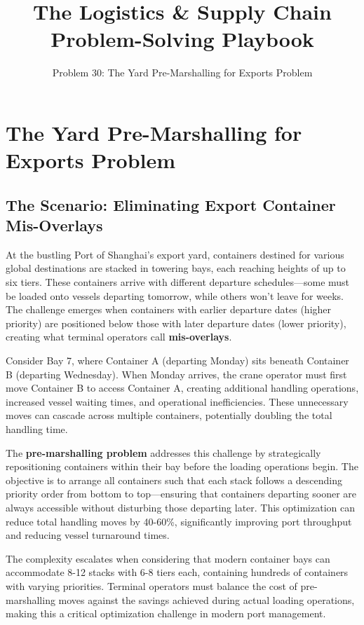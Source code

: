\documentclass{article}
\title{The Logistics \& Supply Chain Problem-Solving Playbook}
\author{Problem 30: The Yard Pre-Marshalling for Exports Problem}
\date{}
\begin{document}
\maketitle

\section{The Yard Pre-Marshalling for Exports Problem}

\subsection{The Scenario: Eliminating Export Container Mis-Overlays}

At the bustling Port of Shanghai's export yard, containers destined for various global destinations are stacked in towering bays, each reaching heights of up to six tiers. These containers arrive with different departure schedules—some must be loaded onto vessels departing tomorrow, while others won't leave for weeks. The challenge emerges when containers with earlier departure dates (higher priority) are positioned below those with later departure dates (lower priority), creating what terminal operators call \textbf{mis-overlays}.

Consider Bay 7, where Container A (departing Monday) sits beneath Container B (departing Wednesday). When Monday arrives, the crane operator must first move Container B to access Container A, creating additional handling operations, increased vessel waiting times, and operational inefficiencies. These unnecessary moves can cascade across multiple containers, potentially doubling the total handling time.

The \textbf{pre-marshalling problem} addresses this challenge by strategically repositioning containers within their bay before the loading operations begin. The objective is to arrange all containers such that each stack follows a descending priority order from bottom to top—ensuring that containers departing sooner are always accessible without disturbing those departing later. This optimization can reduce total handling moves by 40-60\%, significantly improving port throughput and reducing vessel turnaround times.

The complexity escalates when considering that modern container bays can accommodate 8-12 stacks with 6-8 tiers each, containing hundreds of containers with varying priorities. Terminal operators must balance the cost of pre-marshalling moves against the savings achieved during actual loading operations, making this a critical optimization challenge in modern port management.
\end{document}
